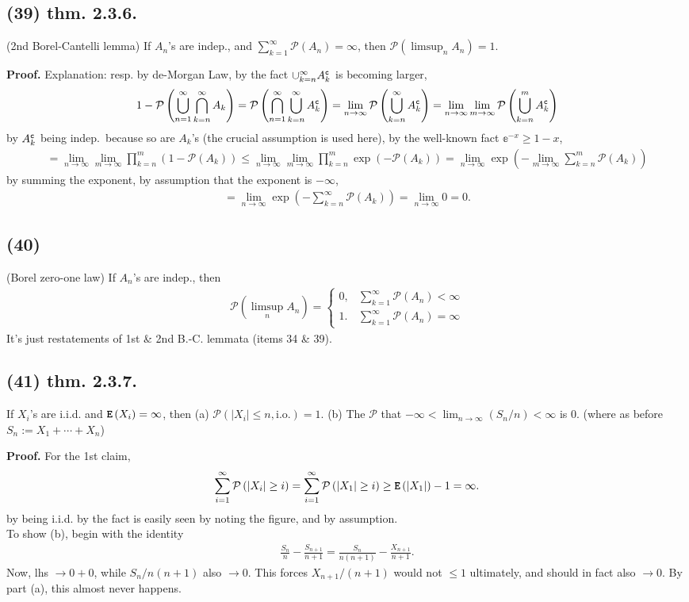 \documentclass[12pt]{article}
\newcommand{\oo}\infty%
\newcommand{\F}\frac%
\newcommand{\ee}{ \BF{e} }%
\newcommand{\Rb}[1]{ \left( #1 \right) }%
\newcommand{\BF}[1]{ \mathbb{#1} }%
\newcommand{\CF}[1]{ \mathcal{#1} }%
\newcommand{\Ss}[1]{\textsf{\bfseries{#1}}}%
\newcommand{\Tw}[1]{\texttt{\bfseries{#1}}}%
\newcommand{\EqGo}[1]{ \begin{gather*}{#1}\end{gather*} } %
\renewcommand{\P}[1]{ \CF P \Rb{#1} }%
\newcommand{\E}[1]{ \Tw{E}\Rb{#1} }%
\begin{document}
\subsection*{(39) thm. 2.3.6.} (2nd Borel-Cantelli lemma) If \(A_n\)'s are indep., and \(\sum_{k=1}^\oo \P{A_n} = \oo\), 
then \(\P{\limsup_n A_n} =1\). \par
\Ss{Proof.} Explanation: resp. by de-Morgan Law, 
by the fact \(\cup_{k=n}^\oo A_k^\Tw{c}\) is becoming larger, \EqGo{
 1- \P{ \bigcup_{n=1}^\oo \bigcap_{k=n}^\oo A_k }
 = \P{ \bigcap_{n=1}^\oo \bigcup_{k=n}^\oo A_k^\Tw{c} } 
 = \lim_{n \to \oo} \P{ \bigcup_{k=n}^\oo A_k^\Tw{c} }
 = \lim_{n \to \oo} \lim_{m \to \oo} \P{ \bigcup_{k=n}^m A_k^\Tw{c} }
} by \(A_k^\Tw{c}\) being indep.\ because so are \(A_k\)'s (the crucial assumption is used here), 
by the well-known fact \(\ee^{-x} \geq 1-x\), \EqGo{
 = \lim_{n \to \oo} \lim_{m \to \oo} \prod_{k=n}^m (1- \P{ A_k })
 \leq \lim_{n \to \oo} \lim_{m \to \oo} \prod_{k=n}^m \exp\Rb{ -\P{A_k} }
 = \lim_{n \to \oo} \exp\Rb{ -\lim_{m \to \oo} \sum_{k=n}^m \P{A_k} }
} by summing the exponent, 
by assumption that the exponent is \(-\oo\), \EqGo{
 = \lim_{n \to \oo} \exp\Rb{ -\sum_{k=n}^\oo \P{A_k} }
 = \lim_{n \to \oo} 0
 =0.
}

\subsection*{(40)} (Borel zero-one law) If \(A_n\)'s are indep., then \begin{gather*}
 \P{\limsup_n A_n} = \begin{cases}
  0, & \sum_{k=1}^\oo \P{A_n} < \oo \\
  1. & \sum_{k=1}^\oo \P{A_n} = \oo
 \end{cases}
\end{gather*} It's just restatements of 1st \& 2nd B.-C. lemmata (items 34 \& 39). 

\subsection*{(41) thm. 2.3.7.} If \(X_i\)'s are i.i.d. and \(\E{X_i} =\oo\), 
then (a) \(\P{|X_i| \leq n, \textrm{i.o.}} =1\). 
(b) The \(\CF P\) that \(-\oo < \lim_{n \to \oo} (S_n /n) < \oo\) is 0. (where as before \(S_n := X_1 +\dotsb+ X_n\)) \par
\Ss{Proof.} For the 1st claim, \EqGo{
 \sum_{i=1}^\oo \P{|X_i| \geq i} 
 = \sum_{i=1}^\oo \P{|X_1| \geq i} 
 \geq \E{|X_1|} -1
 = \oo.
} by being i.i.d. by the fact is easily seen by noting the figure, and by assumption. \\
\indent [Oct. 27] To show (b), begin with the identity \EqGo{
 \F{S_n}{n} - \F{S_{n+1}}{n+1}
 = \F{S_n}{n(n+1)} - \F{X_{n+1}}{n+1}. 
} Now, lhs \(\to 0+0\), while \(S_n /n(n+1)\) also \(\to 0\). 
This forces \(X_{n+1} /(n+1)\) would not \(\leq 1\) ultimately, and should in fact also \(\to 0\). 
By part (a), this almost never happens. 
\end{document}
